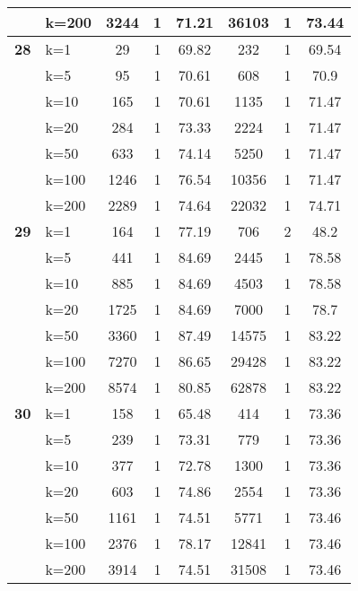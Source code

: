 \begin{table}[htbp]
\begin{tabular}{ll|ccc|ccc}
     & k=200 & 3244 & 1 & 71.21 & 36103 & 1 & 73.44 \\ \hline
    \multicolumn{1}{r}{\textbf{28}} & k=1 & 29 & 1 & 69.82 & 232 & 1 & 69.54 \\ 
     & k=5 & 95 & 1 & 70.61 & 608 & 1 & 70.9 \\ 
     & k=10 & 165 & 1 & 70.61 & 1135 & 1 & 71.47 \\ 
     & k=20 & 284 & 1 & 73.33 & 2224 & 1 & 71.47 \\ 
     & k=50 & 633 & 1 & 74.14 & 5250 & 1 & 71.47 \\ 
     & k=100 & 1246 & 1 & 76.54 & 10356 & 1 & 71.47 \\ 
     & k=200 & 2289 & 1 & 74.64 & 22032 & 1 & 74.71 \\ \hline
    \multicolumn{1}{r}{\textbf{29}} & k=1 & 164 & 1 & 77.19 & 706 & 2 & 48.2 \\ 
     & k=5 & 441 & 1 & 84.69 & 2445 & 1 & 78.58 \\ 
     & k=10 & 885 & 1 & 84.69 & 4503 & 1 & 78.58 \\ 
     & k=20 & 1725 & 1 & 84.69 & 7000 & 1 & 78.7 \\ 
     & k=50 & 3360 & 1 & 87.49 & 14575 & 1 & 83.22 \\ 
     & k=100 & 7270 & 1 & 86.65 & 29428 & 1 & 83.22 \\ 
     & k=200 & 8574 & 1 & 80.85 & 62878 & 1 & 83.22 \\ \hline
    \multicolumn{1}{r}{\textbf{30}} & k=1 & 158 & 1 & 65.48 & 414 & 1 & 73.36 \\ 
     & k=5 & 239 & 1 & 73.31 & 779 & 1 & 73.36 \\ 
     & k=10 & 377 & 1 & 72.78 & 1300 & 1 & 73.36 \\ 
     & k=20 & 603 & 1 & 74.86 & 2554 & 1 & 73.36 \\ 
     & k=50 & 1161 & 1 & 74.51 & 5771 & 1 & 73.46 \\ 
     & k=100 & 2376 & 1 & 78.17 & 12841 & 1 & 73.46 \\ 
     & k=200 & 3914 & 1 & 74.51 & 31508 & 1 & 73.46 \\ \hline
    \end{tabular}
    \label{use_case_5}
    \end{table}
    